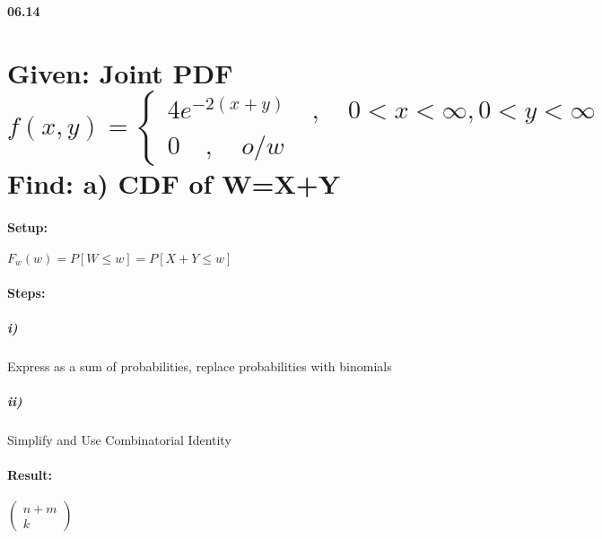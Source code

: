 {\bf 06.14}


\section*{Given: Joint PDF $f(x,y)=\begin{cases} 4{ e }^{ -2(x+y) }\quad ,\quad 0<x<\infty ,0<y<\infty  \\ 0\quad ,\quad o/w \end{cases}$\\ Find: a) CDF of W=X+Y}

\paragraph{Setup:}  ${F}_{w}(w)=P[W\le w]=P[X+Y\le w]$

\paragraph{Steps:} 

\subparagraph{i)} Express as a sum of probabilities, replace probabilities with binomials

\subparagraph{ii)} Simplify and Use Combinatorial Identity

\paragraph{Result:} $\left( \begin{matrix} n+m \\ k \end{matrix} \right) $
